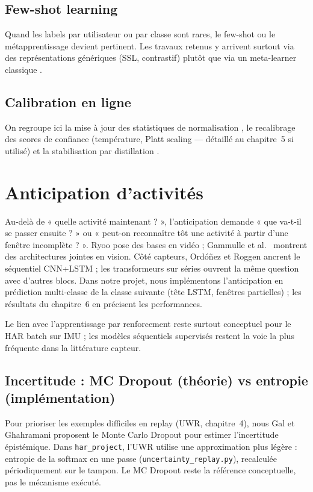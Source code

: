 \documentclass[a4paper,12pt]{report}
\begin{document}
\subsection{Few-shot learning}

Quand les labels par utilisateur ou par classe sont rares, le few-shot ou le
métapprentissage devient pertinent. Les travaux retenus y arrivent surtout via
des représentations génériques (SSL, contrastif) plutôt que via un
meta-learner classique \parencite{yuan2024,tang2021}.

\subsection{Calibration en ligne}

On regroupe ici la mise à jour des statistiques de normalisation
\parencite{mazankiewicz2020}, le recalibrage des scores de confiance (température,
Platt scaling — détaillé au chapitre~5 si utilisé) et la stabilisation par
distillation \parencite{schiemer2023}.

\section{Anticipation d'activités}

Au-delà de « quelle activité maintenant ? », l'anticipation demande « que va-t-il
se passer ensuite ? » ou « peut-on reconnaître tôt une activité à partir d'une
fenêtre incomplète ? ». Ryoo \parencite{ryoo2011} pose des bases en vidéo ;
Gammulle et al.\ \parencite{gammulle2019} montrent des architectures jointes
en vision. Côté capteurs, Ordóñez et Roggen \parencite{ordonyez2016} ancrent
le séquentiel CNN+LSTM ; les transformeurs sur séries
\parencite{dirgova2022} ouvrent la même question avec d'autres blocs. Dans
notre projet, nous implémentons l'anticipation en prédiction multi-classe de
la classe suivante (tête LSTM, fenêtres partielles) ; les résultats du
chapitre~6 en précisent les performances.

Le lien avec l'apprentissage par renforcement reste surtout conceptuel pour le
HAR batch sur IMU ; les modèles séquentiels supervisés restent la voie la plus
fréquente dans la littérature capteur.

\subsection{Incertitude : MC Dropout (théorie) vs entropie (implémentation)}

Pour prioriser les exemples difficiles en replay (UWR, chapitre~4), nous
Gal et Ghahramani \parencite{gal2016} proposent le Monte Carlo Dropout pour
estimer l'incertitude épistémique. Dans \texttt{har\_project}, l'UWR utilise
une approximation plus légère : entropie de la softmax en une passe
(\texttt{uncertainty\_replay.py}), recalculée périodiquement sur le tampon.
Le MC Dropout reste la référence conceptuelle, pas le mécanisme exécuté.
\end{document}
